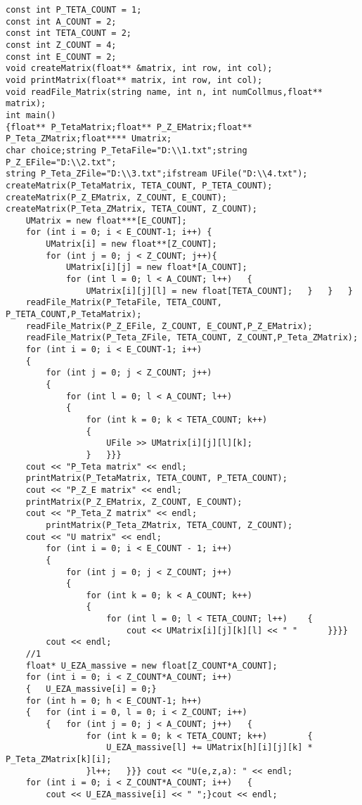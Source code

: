 \documentclass[a4paper,14pt]{extarticle}
\begin{document}
\begin{lstlisting}
const int P_TETA_COUNT = 1;
const int A_COUNT = 2;
const int TETA_COUNT = 2;
const int Z_COUNT = 4;
const int E_COUNT = 2;
void createMatrix(float** &matrix, int row, int col);
void printMatrix(float** matrix, int row, int col);
void readFile_Matrix(string name, int n, int numCollmus,float** matrix);
int main()
{float** P_TetaMatrix;float** P_Z_EMatrix;float** P_Teta_ZMatrix;float**** Umatrix;
char choice;string P_TetaFile="D:\\1.txt";string P_Z_EFile="D:\\2.txt";
string P_Teta_ZFile="D:\\3.txt";ifstream UFile("D:\\4.txt");
createMatrix(P_TetaMatrix, TETA_COUNT, P_TETA_COUNT);
createMatrix(P_Z_EMatrix, Z_COUNT, E_COUNT);
createMatrix(P_Teta_ZMatrix, TETA_COUNT, Z_COUNT);
	UMatrix = new float***[E_COUNT];
	for (int i = 0; i < E_COUNT-1; i++) {
		UMatrix[i] = new float**[Z_COUNT];
		for (int j = 0; j < Z_COUNT; j++){
			UMatrix[i][j] = new float*[A_COUNT];
			for (int l = 0; l < A_COUNT; l++)	{
				UMatrix[i][j][l] = new float[TETA_COUNT];	}	}	}
	readFile_Matrix(P_TetaFile, TETA_COUNT, P_TETA_COUNT,P_TetaMatrix);
	readFile_Matrix(P_Z_EFile, Z_COUNT, E_COUNT,P_Z_EMatrix);
	readFile_Matrix(P_Teta_ZFile, TETA_COUNT, Z_COUNT,P_Teta_ZMatrix);
	for (int i = 0; i < E_COUNT-1; i++)
	{
		for (int j = 0; j < Z_COUNT; j++)
		{
			for (int l = 0; l < A_COUNT; l++)
			{
				for (int k = 0; k < TETA_COUNT; k++)
				{
					UFile >> UMatrix[i][j][l][k];
				}	}}}
	cout << "P_Teta matrix" << endl;
	printMatrix(P_TetaMatrix, TETA_COUNT, P_TETA_COUNT);
	cout << "P_Z_E matrix" << endl;
	printMatrix(P_Z_EMatrix, Z_COUNT, E_COUNT);
	cout << "P_Teta_Z matrix" << endl;
		printMatrix(P_Teta_ZMatrix, TETA_COUNT, Z_COUNT);
	cout << "U matrix" << endl;
		for (int i = 0; i < E_COUNT - 1; i++)
		{
			for (int j = 0; j < Z_COUNT; j++)
			{
				for (int k = 0; k < A_COUNT; k++)
				{
					for (int l = 0; l < TETA_COUNT; l++)	{
						cout << UMatrix[i][j][k][l] << " "		}}}}
		cout << endl;
	//1
	float* U_EZA_massive = new float[Z_COUNT*A_COUNT];
	for (int i = 0; i < Z_COUNT*A_COUNT; i++)
	{	U_EZA_massive[i] = 0;}
	for (int h = 0; h < E_COUNT-1; h++)
	{	for (int i = 0, l = 0; i < Z_COUNT; i++)
		{	for (int j = 0; j < A_COUNT; j++)	{
				for (int k = 0; k < TETA_COUNT; k++)		{		
					U_EZA_massive[l] += UMatrix[h][i][j][k] * P_Teta_ZMatrix[k][i];
				}l++;	}}}	cout << "U(e,z,a): " << endl;
	for (int i = 0; i < Z_COUNT*A_COUNT; i++)	{
		cout << U_EZA_massive[i] << " ";}cout << endl;

\end{lstlisting}
\end{document}

